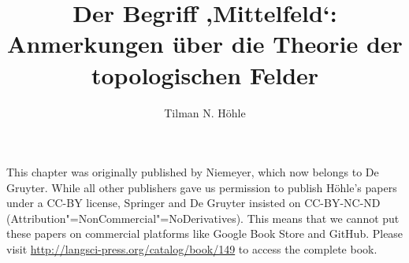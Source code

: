 \documentclass[output=paper]{langsci/langscibook}
\author{Tilman N. Höhle}
\title{Der Begriff ‚Mittelfeld‘:\newlineCover{} Anmerkungen über die Theorie der\newlineTOC{} topologischen Felder}
\begin{document}
\label{chap:5}\label{chap-mittelfeld}


\noindent
This chapter was originally published by Niemeyer, which now belongs to De Gruyter. While all other publishers gave us permission to publish Höhle's papers under a CC-BY
license, Springer and De Gruyter insisted on CC-BY-NC-ND (Attribution"=NonCommercial"=No\-De\-riv\-a\-tives).
This means that we cannot put these papers on commercial platforms like Google Book Store and GitHub. Please
visit \url{http://langsci-press.org/catalog/book/149} to access the complete book.




\pagebreak~
\setcounter{page}{294}
\label{chap-mittelfeld-end}
\end{document}
